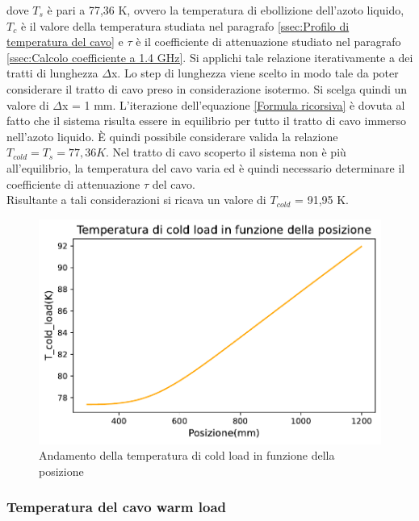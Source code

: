 dove $T_{s}$ è pari a 77,36 K, ovvero la temperatura di ebollizione dell'azoto liquido, $T_{c}$ è il valore della temperatura studiata nel paragrafo \ref{ssec:Profilo di temperatura del cavo} e $\tau$ è il coefficiente di attenuazione studiato nel paragrafo \ref{ssec:Calcolo coefficiente a 1.4 GHz}.
Si applichi tale relazione iterativamente a dei tratti di lunghezza $\Delta$x. Lo step di lunghezza viene scelto in modo tale da poter considerare il tratto di cavo preso in considerazione isotermo. Si scelga quindi un valore di $\Delta$x = 1 mm.
L'iterazione dell'equazione \eqref{Formula ricorsiva} è dovuta al fatto che il sistema risulta essere in equilibrio per tutto il tratto di cavo immerso nell'azoto liquido. \`E quindi possibile considerare valida la relazione $T_{cold} = T_{s} = 77,36 K$. Nel tratto di cavo scoperto il sistema non è più all'equilibrio, la temperatura del cavo varia ed è quindi necessario determinare il coefficiente di attenuazione $\tau$ del cavo.\\
Risultante a tali considerazioni si ricava un valore di $T_{cold}$ = 91,95 K.

\begin{figure}[H]
	\centering
	\includegraphics[scale=0.8]{Temperatura_vs_posizione.pdf}
	\caption{Andamento della temperatura di cold load in funzione della posizione}
    	\label{fig:Temperatura_vs_posizione}
\end{figure}


\subsubsection{Temperatura del cavo warm load}
\label{ssec:Temperatura del cavo warm load}

